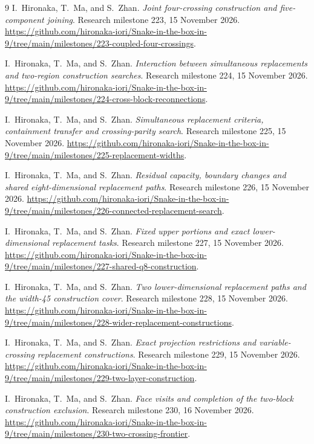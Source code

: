 \documentclass[11pt,a4paper]{article}
\begin{document}
\begin{thebibliography}{9}
I.~Hironaka, T.~Ma, and S.~Zhan. \emph{Joint four-crossing construction
and five-component joining}. Research milestone 223, 15 November 2026.
\url{https://github.com/hironaka-iori/Snake-in-the-box-in-9/tree/main/milestones/223-coupled-four-crossings}.

I.~Hironaka, T.~Ma, and S.~Zhan. \emph{Interaction between simultaneous
replacements and two-region construction searches}.
Research milestone 224, 15 November 2026.
\url{https://github.com/hironaka-iori/Snake-in-the-box-in-9/tree/main/milestones/224-cross-block-reconnections}.

I.~Hironaka, T.~Ma, and S.~Zhan. \emph{Simultaneous replacement criteria,
containment transfer and crossing-parity search}. Research milestone 225,
15 November 2026.
\url{https://github.com/hironaka-iori/Snake-in-the-box-in-9/tree/main/milestones/225-replacement-widths}.

I.~Hironaka, T.~Ma, and S.~Zhan. \emph{Residual capacity, boundary changes
and shared eight-dimensional replacement paths}. Research milestone 226,
15 November 2026.
\url{https://github.com/hironaka-iori/Snake-in-the-box-in-9/tree/main/milestones/226-connected-replacement-search}.

I.~Hironaka, T.~Ma, and S.~Zhan. \emph{Fixed upper portions and exact
lower-dimensional replacement tasks}. Research milestone 227,
15 November 2026.
\url{https://github.com/hironaka-iori/Snake-in-the-box-in-9/tree/main/milestones/227-shared-q8-construction}.

I.~Hironaka, T.~Ma, and S.~Zhan. \emph{Two lower-dimensional replacement
paths and the width-45 construction cover}. Research milestone 228,
15 November 2026.
\url{https://github.com/hironaka-iori/Snake-in-the-box-in-9/tree/main/milestones/228-wider-replacement-constructions}.

I.~Hironaka, T.~Ma, and S.~Zhan. \emph{Exact projection restrictions and
variable-crossing replacement constructions}. Research milestone 229,
15 November 2026.
\url{https://github.com/hironaka-iori/Snake-in-the-box-in-9/tree/main/milestones/229-two-layer-construction}.

I.~Hironaka, T.~Ma, and S.~Zhan. \emph{Face visits and completion of the
two-block construction exclusion}. Research milestone 230,
16 November 2026.
\url{https://github.com/hironaka-iori/Snake-in-the-box-in-9/tree/main/milestones/230-two-crossing-frontier}.


\end{thebibliography}
\end{document}
